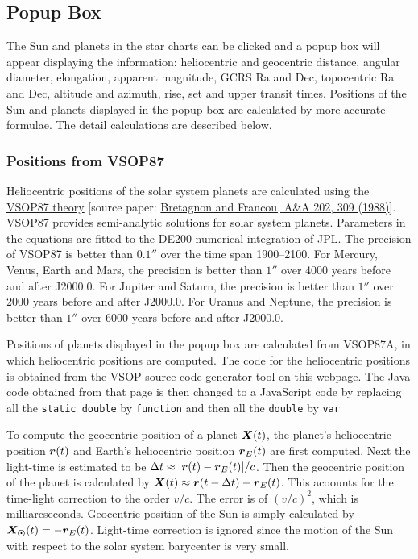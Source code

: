 \documentclass[12pt]{article}
\newcommand{\ve}[1]{\mbox{\boldmath $#1$}}
\begin{document}
\subsection{Popup Box} 

The Sun and planets in the star charts can be clicked and a popup box 
will appear displaying the information: heliocentric and geocentric distance, 
angular diameter, elongation, apparent magnitude, GCRS Ra and Dec, 
topocentric Ra and Dec, altitude and azimuth, rise, set and upper transit times. 
Positions of the Sun and planets displayed in the popup box are calculated by more 
accurate formulae. The detail calculations are described below.

\subsubsection{Positions from VSOP87} 

Heliocentric positions of the solar system planets are calculated using the 
\href{http://neoprogrammics.com/vsop87/}{VSOP87 theory} [source
paper: \href{https://ui.adsabs.harvard.edu/#abs/1988A&A...202..309B/abstract}
{Bretagnon and Francou, A\&A 202, 309 (1988)}]. VSOP87 provides semi-analytic 
solutions for solar system planets. Parameters in the equations are fitted to the 
DE200 numerical integration of JPL. The precision of VSOP87 is better than $0.1''$ 
over the time span 1900--2100. For Mercury, Venus, Earth and Mars, the 
precision is better than $1''$ over 4000 years before and after 
J2000.0. For Jupiter and Saturn, the precision is better than $1''$ over 2000 years 
before and after J2000.0. For Uranus and Neptune, the precision is better than 
$1''$ over 6000 years before and after J2000.0. 

Positions of planets displayed in the popup box are calculated from 
VSOP87A, in which heliocentric positions are computed. The code 
for the heliocentric positions is obtained from the VSOP source 
code generator tool on 
\href{http://neoprogrammics.com/vsop87/source_code_generator_tool/index.php}{this webpage}. 
The Java code obtained from that page is then changed to a JavaScript code by 
replacing all the {\tt static double} by {\tt function} and then all the 
{\tt double} by {\tt var} 

To compute the geocentric position of a planet $\ve{X}(t)$, the planet's heliocentric 
position $\ve{r}(t)$ and Earth's heliocentric position $\ve{r}_E(t)$ are first computed. 
Next the light-time is estimated to be $\Delta t \approx |\ve{r}(t)-\ve{r}_E(t)|/c$. 
Then the geocentric position of the planet is calculated by $\ve{X}(t) \approx
\ve{r}(t-\Delta t) - \ve{r}_E(t)$. This acoounts for the time-light correction to the order 
$v/c$. The error is of $(v/c)^2$, which is milliarcseconds. Geocentric 
position of the Sun is simply calculated by $\ve{X_{\odot}}(t)=-\ve{r}_E(t)$. Light-time 
correction is ignored since the motion of the Sun with respect to the solar system 
barycenter is very small.
\end{document}
